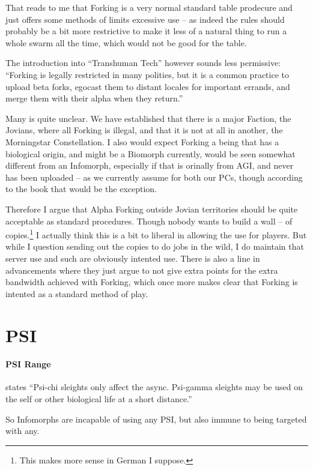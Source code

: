 That reads to me that Forking is a very normal standard table prodecure and just offers some methods of limits excessive use -- as indeed the rules should probably be a bit more restrictive to make it less of a natural thing to run a whole swarm all the time, which would not be good for the table.

The introduction into “Transhuman Tech” however sounds less permissive: “Forking is legally restricted in many polities, but it is a common practice to upload beta forks, egocast them to distant locales for important errands, and merge them with their alpha when they return.” \citep[pg. 286]{ep2e_1.1_2019}

Many is quite unclear. We have established that there is a major Faction, the Jovians, where all Forking is illegal, and that it is not at all in another, the Morningstar Constellation. I also would expect Forking a being that has a biological origin, and might be a Biomorph currently, would be seen somewhat different from an Infomorph, especially if that is orinally from AGI, and never has been uploaded -- as we currently assume for both our PCs, though according to the book that would be the exception.

Therefore I argue that Alpha Forking outside Jovian territories should be quite acceptable as standard procedures. Though nobody wants to build a wall -- of copies.\footnote{This makes more sense in German I suppose.} I actually think this is a bit to liberal in allowing the use for players. But while I question sending out the copies to do jobs in the wild, I do maintain that server use and such are obviously intented use. There is also a line in advancements where they just argue to not give extra points for the extra bandwidth achieved with Forking, which once more makes clear that Forking is intented as a standard method of play.


\section{PSI}

\paragraph{PSI Range} states “Psi-chi sleights only affect the async. Psi-gamma sleights may be used on the self or other biological life at a short distance.” \citep[pg. 276]{ep2e_1.1_2019}

So Infomorphs are incapable of using any PSI, but also immune to being targeted with any.
